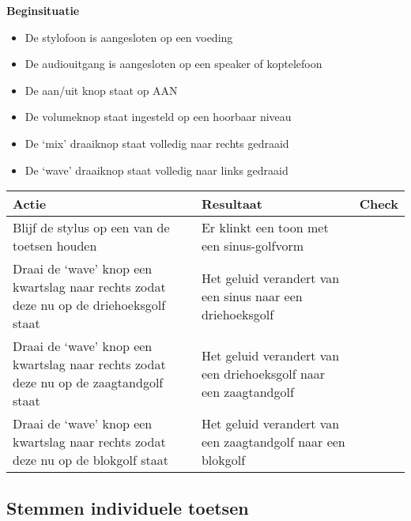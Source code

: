 \documentclass[12pt, a4paper, dutch]{article}
\newcommand{\cb}{\Square}
\newcommand{\stroom}{De stylofoon is aangesloten op een voeding}
\newcommand{\audio}{De audiouitgang is aangesloten op een speaker of koptelefoon}
\newcommand{\aan}{De aan/uit knop staat op AAN}
\newcommand{\vol}{De volumeknop staat ingesteld op een hoorbaar niveau}
\begin{document}
\begin{minipage}{\textwidth}
\textbf{Beginsituatie}
\begin{itemize}
	\item \stroom
	\item \audio
	\item \aan
	\item \vol
	\item De `mix' draaiknop staat volledig naar rechts gedraaid
	\item De `wave' draaiknop staat volledig naar links gedraaid
\end{itemize}

\medskip

\begin{tabularx}{\textwidth}{p{}p{}>{\raggedleft\arraybackslash}X}
\toprule
\textbf{Actie} & \textbf{Resultaat} & \textbf{Check}\\
\midrule
Blijf de stylus op een van de toetsen houden &
Er klinkt een toon met een sinus-golfvorm &
\cb\\

Draai de `wave' knop een kwartslag naar rechts zodat deze nu op de driehoeksgolf
staat &
Het geluid verandert van een sinus naar een driehoeksgolf &
\cb\\

Draai de `wave' knop een kwartslag naar rechts zodat deze nu op de zaagtandgolf
staat &
Het geluid verandert van een driehoeksgolf naar een zaagtandgolf &
\cb\\

Draai de `wave' knop een kwartslag naar rechts zodat deze nu op de blokgolf staat &
Het geluid verandert van een zaagtandgolf naar een blokgolf &
\cb\\
\bottomrule
\end{tabularx}
\end{minipage}

\subsection{Stemmen individuele toetsen}
\end{document}

